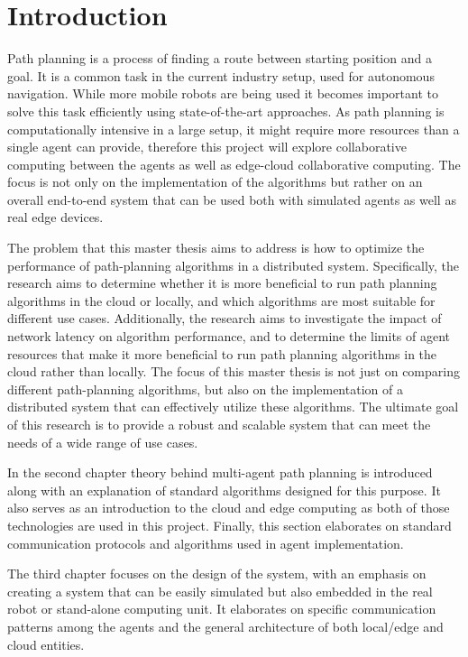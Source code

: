 \chapter{Introduction}

Path planning is a process of finding a route between starting position and a goal. It is a common task in the current industry setup, used for autonomous navigation. While more mobile robots are being used it becomes important to solve this task efficiently using state-of-the-art approaches. As path planning is computationally intensive in a large setup, it might require more resources than a single agent can provide, therefore this project will explore collaborative computing between the agents as well as edge-cloud collaborative computing. The focus is not only on the implementation of the algorithms but rather on an overall end-to-end system that can be used both with simulated agents as well as real edge devices.

The problem that this master thesis aims to address is how to optimize the performance of path-planning algorithms in a distributed system. Specifically, the research aims to determine whether it is more beneficial to run path planning algorithms in the cloud or locally, and which algorithms are most suitable for different use cases. Additionally, the research aims to investigate the impact of network latency on algorithm performance, and to determine the limits of agent resources that make it more beneficial to run path planning algorithms in the cloud rather than locally. The focus of this master thesis is not just on comparing different path-planning algorithms, but also on the implementation of a distributed system that can effectively utilize these algorithms. The ultimate goal of this research is to provide a robust and scalable system that can meet the needs of a wide range of use cases.

In the second chapter theory behind multi-agent path planning is introduced along with an explanation of standard algorithms designed for this purpose. It also serves as an introduction to the cloud and edge computing as both of those technologies are used in this project. Finally, this section elaborates on standard communication protocols and algorithms used in agent implementation.

The third chapter focuses on the design of the system, with an emphasis on creating a system that can be easily simulated but also embedded in the real robot or stand-alone computing unit. It elaborates on specific communication patterns among the agents and the general architecture of both local/edge and cloud entities.

